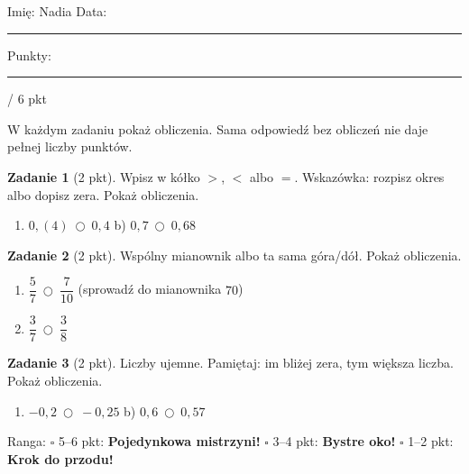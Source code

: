 \documentclass[11pt,a4paper]{article}
\begin{document}

\vspace{0.2em}
Imię: Nadia \hfill Data: \rule{3cm}{0.4pt} \hfill Punkty: \rule{1.2cm}{0.4pt} / 6 pkt

{\small W każdym zadaniu pokaż obliczenia. Sama odpowiedź bez obliczeń nie daje pełnej liczby punktów.}

\vspace{0.4em}

\textbf{Zadanie 1} (2 pkt). Wpisz w kółko $>$, $<$ albo $=$. Wskazówka: rozpisz okres albo dopisz zera. Pokaż obliczenia.
\begin{enumerate}[label=\alph*), leftmargin=*, itemsep=4pt]
  \item $0{,}(4)\ \bigcirc\ 0{,}4$ \hspace{1cm} b) $0{,}7\ \bigcirc\ 0{,}68$
\end{enumerate}
\miejsce{3.8cm}

\textbf{Zadanie 2} (2 pkt). Wspólny mianownik albo ta sama góra/dół. Pokaż obliczenia.
\begin{enumerate}[label=\alph*), leftmargin=*, itemsep=4pt]
  \item $\dfrac{5}{7}\ \bigcirc\ \dfrac{7}{10}$ \hspace{1cm} (sprowadź do mianownika $70$)
  \item $\dfrac{3}{7}\ \bigcirc\ \dfrac{3}{8}$
\end{enumerate}
\miejsce{4.4cm}

\textbf{Zadanie 3} (2 pkt). Liczby ujemne. Pamiętaj: im bliżej zera, tym większa liczba. Pokaż obliczenia.
\begin{enumerate}[label=\alph*), leftmargin=*, itemsep=4pt]
  \item $-0{,}2\ \bigcirc\ -0{,}25$ \hspace{1cm} b) $0{,}6\ \bigcirc\ 0{,}57$
\end{enumerate}
\miejsce{4.4cm}

\vfill
\begin{tcolorbox}[colback=white, colframe=cel, boxrule=0.6pt, arc=2pt]
Ranga: \quad $\square$ 5--6 pkt: \textbf{Pojedynkowa mistrzyni!} \quad $\square$ 3--4 pkt: \textbf{Bystre oko!} \quad $\square$ 1--2 pkt: \textbf{Krok do przodu!}
\end{tcolorbox}
\end{document}
